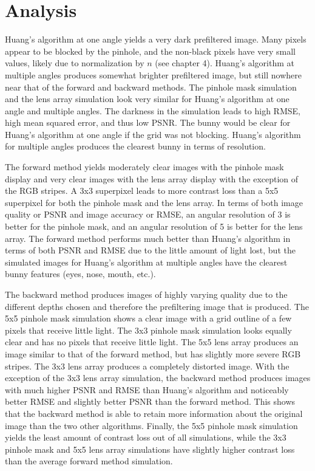 \section{Analysis}
Huang's algorithm at one angle yields a very dark prefiltered image. Many pixels appear to be blocked by the pinhole, and the non-black pixels have very small values, likely due to normalization by $n$ (see chapter 4). Huang's algorithm at multiple angles produces somewhat brighter prefiltered image, but still nowhere near that of the forward and backward methods. The pinhole mask simulation and the lens array simulation look very similar for Huang's algorithm at one angle and multiple angles. The darkness in the simulation leads to high RMSE, high mean squared error, and thus low PSNR. The bunny would be clear for Huang's algorithm at one angle if the grid was not blocking. Huang's algorithm for multiple angles produces the clearest bunny in terms of resolution.

The forward method yields moderately clear images with the pinhole mask display and very clear images with the lens array display with the exception of the RGB stripes. A 3x3 superpixel leads to more contrast loss than a 5x5 superpixel for both the pinhole mask and the lens array. In terms of both image quality or PSNR and image accuracy or RMSE, an angular resolution of 3 is better for the pinhole mask, and an angular resolution of 5 is better for the lens array. The forward method performs much better than Huang's algorithm in terms of both PSNR and RMSE due to the little amount of light lost, but the simulated images for Huang's algorithm at multiple angles have the clearest bunny features (eyes, nose, mouth, etc.).

The backward method produces images of highly varying quality due to the different depths chosen and therefore the prefiltering image that is produced. The 5x5 pinhole mask simulation shows a clear image with a grid outline of a few pixels that receive little light. The 3x3 pinhole mask simulation looks equally clear and has no pixels that receive little light. The 5x5 lens array produces an image similar to that of the forward method, but has slightly more severe RGB stripes.  The 3x3 lens array produces a completely distorted image. With the exception of the 3x3 lens array simulation, the backward method produces images with much higher PSNR and RMSE than Huang's algorithm and noticeably better RMSE and slightly better PSNR than the forward method. This shows that the backward method is able to retain more information about the original image than the two other algorithms. Finally, the 5x5 pinhole mask simulation yields the least amount of contrast loss out of all simulations, while the 3x3 pinhole mask and 5x5 lens array simulations have slightly higher contrast loss than the average forward method simulation.





